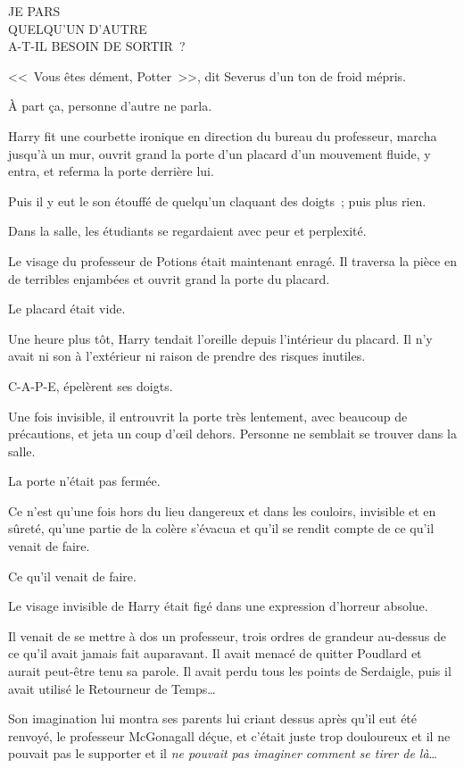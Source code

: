 \begin{writtenNote}
JE PARS\\
QUELQU'UN D'AUTRE\\
A-T-IL BESOIN DE SORTIR~?
\end{writtenNote}

<<~Vous êtes dément, Potter~>>, dit Severus d'un ton de froid mépris.

À part ça, personne d'autre ne parla.

Harry fit une courbette ironique en direction du bureau du professeur, marcha jusqu'à un mur, ouvrit grand la porte d'un placard d'un mouvement fluide, y entra, et referma la porte derrière lui.

Puis il y eut le son étouffé de quelqu'un claquant des doigts~; puis plus rien.

Dans la salle, les étudiants se regardaient avec peur et perplexité.

Le visage du professeur de Potions était maintenant enragé. Il traversa la pièce en de terribles enjambées et ouvrit grand la porte du placard.

Le placard était vide.

\later

Une heure plus tôt, Harry tendait l'oreille depuis l'intérieur du placard. Il n'y avait ni son à l'extérieur ni raison de prendre des risques inutiles.

C-A-P-E, épelèrent ses doigts.

Une fois invisible, il entrouvrit la porte très lentement, avec beaucoup de précautions, et jeta un coup d'œil dehors. Personne ne semblait se trouver dans la salle.

La porte n'était pas fermée.

Ce n'est qu'une fois hors du lieu dangereux et dans les couloirs, invisible et en sûreté, qu'une partie de la colère s'évacua et qu'il se rendit compte de ce qu'il venait de faire.

Ce qu'il venait de faire.

Le visage invisible de Harry était figé dans une expression d'horreur absolue.

Il venait de se mettre à dos un professeur, trois ordres de grandeur au-dessus de ce qu'il avait jamais fait auparavant. Il avait menacé de quitter Poudlard et aurait peut-être tenu sa parole. Il avait perdu tous les points de Serdaigle, puis il avait utilisé le Retourneur de Temps…

Son imagination lui montra ses parents lui criant dessus après qu'il eut été renvoyé, le professeur McGonagall déçue, et c'était juste trop douloureux et il ne pouvait pas le supporter et il \emph{ne pouvait pas imaginer comment se tirer de là}…

